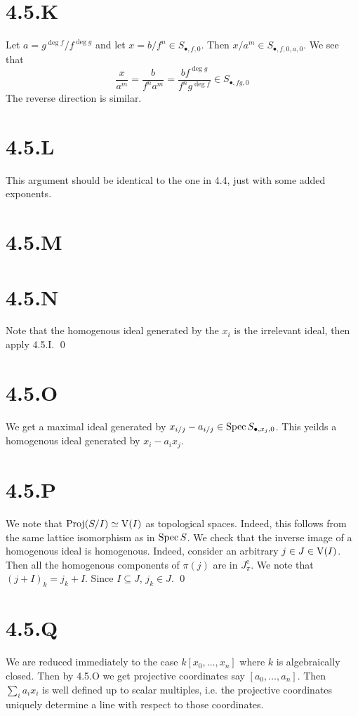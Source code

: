 \documentclass{article}
\begin{document}
\section{4.5.K}
Let $a=g^{\deg f}/f^{\deg g}$ and let $x = b/f^n \in S_{\bullet, f, 0}$. Then
$x/a^m \in S_{\bullet, f, 0, a, 0}$. We see that \[
      \frac{x}{a^m} = \frac{b}{f^na^m} =
      \frac{bf^{\deg g}}{f^ng^{\deg f}} \in
      S_{\bullet, fg, 0}
\] The reverse
direction is similar.

\section{4.5.L}
This argument should be identical to the one in 4.4, just with some added
exponents.

\section{4.5.M}
\section{4.5.N}
Note that the homogenous ideal generated by the $x_i$ is the
irrelevant ideal, then apply 4.5.I. \qed

\section{4.5.O}
We get a maximal ideal generated by $x_{i/j}-a_{i/j} \in \operatorname{Spec} S_{\bullet, x_j, 0}$. This yeilds a
homogenous ideal generated by $x_i-a_ix_j$.

\section{4.5.P}
We note that $\operatorname{Proj}(S/I) \simeq \operatorname{V}(I)$ as topological spaces. Indeed, this
follows from the same lattice isomorphism as in $\operatorname{Spec} S$. We
check that the inverse image of a homogenous ideal is homogenous. Indeed,
consider an arbitrary $j \in J \in \operatorname{V}(I)$. Then all the homogenous
components of $\pi(j)$ are in $J^{\text{e}}_{\pi}$. We note
that $(j+I)_k = j_k+I$. Since $I \subseteq J$,
$j_k \in J$. \qed

\section{4.5.Q}
We are reduced immediately to the case $k[x_0,\dots, x_n]$ where
$k$ is algebraically closed. Then by 4.5.O we get
projective coordinates say $[a_0, \dots, a_n]$. Then
$\sum_i a_ix_i$ is well defined up to scalar multiples, i.e. the
projective coordinates uniquely determine a line with respect to those
coordinates.
\end{document}

